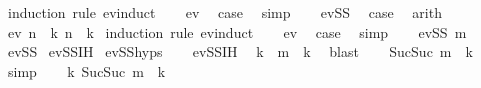 \begin{isabellebody}
%
\isadelimproof
%
\endisadelimproof
%
\isatagproof
{}\isamarkupfalse%
\ {\isacharparenleft}{\kern0pt}induction\ rule{\isacharcolon}{\kern0pt}\ ev{\isachardot}{\kern0pt}induct{\isacharparenright}{\kern0pt}\isanewline
\ \ \isamarkupfalse%
\ ev{}\ \isamarkupfalse%
\ {\isacharquery}{\kern0pt}case\ \isamarkupfalse%
\ simp\isanewline
{}\isamarkupfalse%
\isanewline
\ \ \isamarkupfalse%
\ evSS\ \isamarkupfalse%
\ {\isacharquery}{\kern0pt}case\ \isamarkupfalse%
\ arith\isanewline
{}\isamarkupfalse%
%
\endisatagproof
{\isafoldproof}%
%
\isadelimproof
\isanewline
%
\endisadelimproof
\isanewline
\isanewline
{}\isamarkupfalse%
\ {\isachardoublequoteopen}ev\ n\ {\isasymLongrightarrow}\ {\isasymexists}k{\isachardot}{\kern0pt}\ n\ {\isacharequal}{\kern0pt}\ {}{\isacharasterisk}{\kern0pt}k{\isachardoublequoteclose}\isanewline
%
\isadelimproof
%
\endisadelimproof
%
\isatagproof
{}\isamarkupfalse%
\ {\isacharparenleft}{\kern0pt}induction\ rule{\isacharcolon}{\kern0pt}\ ev{\isachardot}{\kern0pt}induct{\isacharparenright}{\kern0pt}\isanewline
\ \ \isamarkupfalse%
\ ev{}\ \isamarkupfalse%
\ {\isacharquery}{\kern0pt}case\ \isamarkupfalse%
\ simp\isanewline
{}\isamarkupfalse%
\isanewline
\ \ \isamarkupfalse%
\ {\isacharparenleft}{\kern0pt}evSS\ m{\isacharparenright}{\kern0pt}\isanewline
{}\isamarkupfalse%
\ evSS\isanewline
{}\isamarkupfalse%
\ evSS{\isachardot}{\kern0pt}IH\isanewline
{}\isamarkupfalse%
\ evSS{\isachardot}{\kern0pt}hyps\isanewline
\ \ \isamarkupfalse%
\ evSS{\isachardot}{\kern0pt}IH\ \isamarkupfalse%
\ k\ \ {\isachardoublequoteopen}m\ {\isacharequal}{\kern0pt}\ {}{\isacharasterisk}{\kern0pt}k{\isachardoublequoteclose}\ \isamarkupfalse%
\ blast\isanewline
\ \ \isamarkupfalse%
\ {\isachardoublequoteopen}Suc{\isacharparenleft}{\kern0pt}Suc\ m{\isacharparenright}{\kern0pt}\ {\isacharequal}{\kern0pt}\ {}{\isacharasterisk}{\kern0pt}{\isacharparenleft}{\kern0pt}k{\isacharplus}{\kern0pt}{}{\isacharparenright}{\kern0pt}{\isachardoublequoteclose}\ \isamarkupfalse%
\ simp\isanewline
\ \ \isamarkupfalse%
\ {\isachardoublequoteopen}{\isasymexists}k{\isachardot}{\kern0pt}\ Suc{\isacharparenleft}{\kern0pt}Suc\ m{\isacharparenright}{\kern0pt}\ {\isacharequal}{\kern0pt}\ {}{\isacharasterisk}{\kern0pt}k{\isachardoublequoteclose}\ \isamarkupfalse%

\end{isabellebody}
